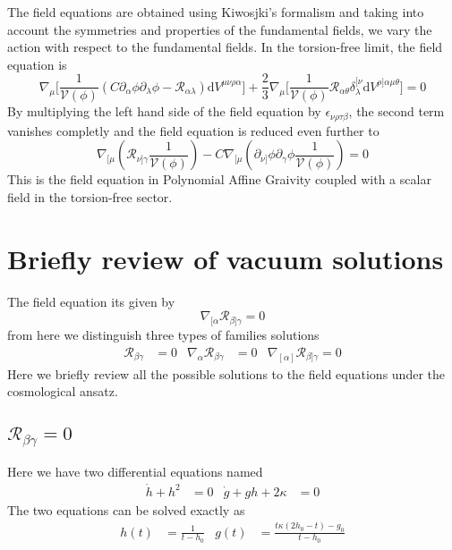 \documentclass[10pt,a4paper]{article}
\begin{document}
The field equations are obtained using Kiwosjki's formalism and taking into account the symmetries and properties of the fundamental fields, we 
vary the action with respect to the fundamental fields. In the torsion-free limit, the field equation is
\begin{equation}
  \nabla_\mu \biggl[\frac{1}{\mathcal{V}(\phi)} \left(C \partial_\alpha \phi \partial_\lambda \phi - \mathcal{R}_{\alpha\lambda}\right)\mathrm{d}V^{\mu\nu\rho\alpha}\biggr] 
  + \frac{2}{3}\nabla_\mu \biggl[ \frac{1}{\mathcal{V}(\phi)}\mathcal{R}_{\alpha\theta} \delta^{[\nu}_{\lambda}\mathrm{d}V^{\rho]\alpha\mu\theta} \biggr] = 0
\end{equation}
By multiplying the left hand side of the field equation by $\epsilon_{\nu\rho\tau\beta}$, the second term vanishes completly and the field 
equation is reduced even further to
\begin{equation}
  \nabla_{[\mu}\left(\mathcal{R}_{\nu]\gamma}\frac{1}{\mathcal{V}(\phi)}\right) 
  - C \nabla_{[\mu}\left(\partial_{\nu]} \phi \partial_\gamma \phi \frac{1}{\mathcal{V}(\phi)}\right) = 0
\end{equation}
This is the field equation in Polynomial Affine Graivity coupled with a scalar field in the torsion-free sector.

\section{Briefly review of vacuum solutions}

The field equation its given by 
\begin{equation}
  \nabla_{[\alpha}\mathcal{R}_{\beta]\gamma} = 0
\end{equation}
from here we distinguish three types of families solutions
\begin{align}
  \mathcal{R}_{\beta\gamma} & = 0 & \nabla_{\alpha}\mathcal{R}_{\beta\gamma} & = 0 & \nabla_{[\alpha]}\mathcal{R}_{\beta]\gamma} = 0
\end{align}
Here we briefly review all the possible solutions to the field equations under the cosmological ansatz.

\subsection{$\mathcal{R}_{\beta\gamma} = 0$}

Here we have two differential equations named
\begin{align}
  \dot{h} + h^2 & = 0 & \dot{g} + gh + 2\kappa & = 0
\end{align}
The two equations can be solved exactly as
\begin{align}
  h(t) & = \frac{1}{t - h_0} & g(t) & =  \frac{t\kappa\left(2h_0 - t\right) - g_0}{t - h_0}
\end{align}
\end{document}
